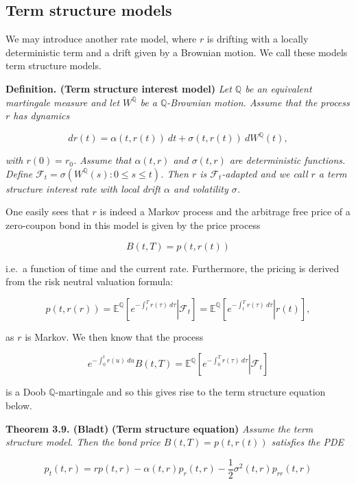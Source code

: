 \documentclass[a4paper,12pt,openany]{book}
\begin{document}
\hypertarget{term-structure-models}{%
\subsection{Term structure models}\label{term-structure-models}}

We may introduce another rate model, where \(r\) is drifting with a locally deterministic term and a drift given by a Brownian motion. We call these models term structure models.

\textbf{Definition. (Term structure interest model)} \emph{Let \(\mathbb Q\) be an equivalent martingale measure and let \(W^{\mathbb Q}\) be a \(\mathbb Q\)-Brownian motion. Assume that the process \(r\) has dynamics}

\[
dr(t)=\alpha(t,r(t))\ dt + \sigma(t,r(t))\ dW^{\mathbb Q}(t),
\]

\emph{with \(r(0)=r_0\). Assume that \(\alpha(t,r)\) and \(\sigma(t,r)\) are deterministic functions. Define \(\mathcal F_t=\sigma(W^{\mathbb Q}(s) : 0\le s\le t)\). Then \(r\) is \(\mathcal F_t\)-adapted and we call \(r\) a term structure interest rate with local drift \(\alpha\) and volatility \(\sigma\).}

One easily sees that \(r\) is indeed a Markov process and the arbitrage free price of a zero-coupon bond in this model is given by the price process

\[
B(t,T)=p(t,r(t))
\]

i.e.~a function of time and the current rate. Furthermore, the pricing is derived from the risk neutral valuation formula:

\[
p(t,r(r))=\mathbb E^{\mathbb Q}\left[\left.e^{-\int_t^Tr(\tau)\ d\tau} \right\vert \mathcal{F}_t\right]=\mathbb E^{\mathbb Q}\left[\left.e^{-\int_t^Tr(\tau)\ d\tau} \right\vert r(t)\right],
\]

as \(r\) is Markov. We then know that the process

\[
e^{-\int_0^t r(u)\ du}B(t,T)=\mathbb E^{\mathbb Q}\left[\left.e^{-\int_0^Tr(\tau)\ d\tau} \right\vert \mathcal{F}_t\right]\tag{23}
\]

is a Doob \(\mathbb Q\)-martingale and so this gives rise to the term structure equation below.

\textbf{Theorem 3.9. (Bladt)} \textbf{(Term structure equation)} \emph{Assume the term structure model. Then the bond price \(B(t,T)=p(t,r(t))\) satisfies the PDE}

\[
p_t(t,r)=rp(t,r)-\alpha(t,r)p_r(t,r)-\frac{1}{2}\sigma^2(t,r)p_{rr}(t,r)
\]
\end{document}
